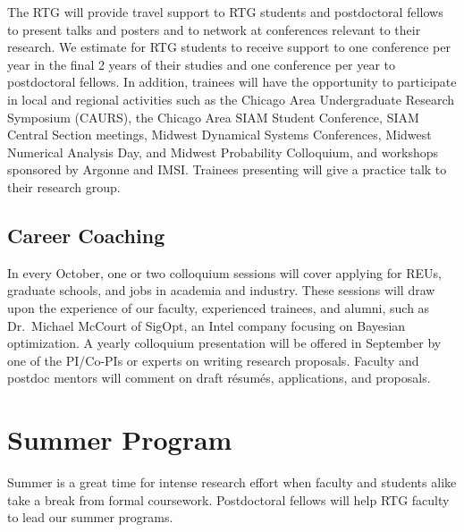 \documentclass[11pt]{NSFamsart}
\newcommand{\FredNote}[1]{{\color{blue} Fred: #1}}
\begin{document}
The RTG will provide travel support to RTG students and postdoctoral fellows to  present talks and posters and to network at conferences relevant to their research. We estimate for RTG students to receive support to one conference per year in the final 2 years of their studies and one conference per year to postdoctoral fellows.  In addition, trainees will have the opportunity to participate in local and regional activities such as the Chicago Area Undergraduate Research Symposium (CAURS), the Chicago Area SIAM Student Conference, SIAM Central Section meetings, Midwest Dynamical Systems Conferences, Midwest Numerical Analysis Day, and Midwest Probability Colloquium, and workshops sponsored by Argonne and IMSI. Trainees presenting will give a practice talk to their research group.

\subsection*{Career Coaching}
In every October, one or two colloquium sessions will cover applying for REUs, graduate schools, and jobs in academia and industry. These sessions will draw upon the experience of our faculty, experienced trainees, and alumni, such as Dr.\ Michael McCourt of SigOpt, an Intel company focusing on Bayesian optimization.  A yearly colloquium presentation  will be offered in September by one of the PI/Co-PIs or experts on writing research proposals. Faculty and postdoc mentors will comment on draft r\'esum\'es,  applications, and proposals.  




\section{Summer Program} \label{sec:summer}

Summer is a great time for intense research effort when faculty and students alike take a break from formal coursework.  Postdoctoral fellows will help RTG faculty to lead our  summer programs.
\end{document}
